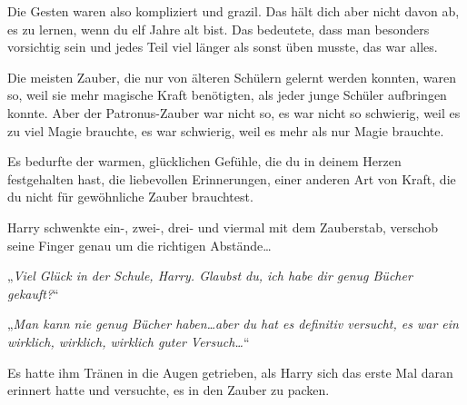Die Gesten waren also kompliziert und grazil. Das hält dich aber nicht davon ab, es zu lernen, wenn du elf Jahre alt bist. Das bedeutete, dass man besonders vorsichtig sein und jedes Teil viel länger als sonst üben musste, das war alles.

Die meisten Zauber, die nur von älteren Schülern gelernt werden konnten, waren so, weil sie mehr magische Kraft benötigten, als jeder junge Schüler aufbringen konnte. Aber der Patronus-Zauber war nicht so, es war nicht so schwierig, weil es zu viel Magie brauchte, es war schwierig, weil es mehr als nur Magie brauchte.

Es bedurfte der warmen, glücklichen Gefühle, die du in deinem Herzen festgehalten hast, die liebevollen Erinnerungen, einer anderen Art von Kraft, die du nicht für gewöhnliche Zauber brauchtest.

Harry schwenkte ein-, zwei-, drei- und viermal mit dem Zauberstab, verschob seine Finger genau um die richtigen Abstände…

„\emph{Viel Glück in der Schule, Harry. Glaubst du, ich habe dir genug Bücher gekauft?}“

„\emph{Man kann nie genug Bücher haben…aber du hat es \emph{definitiv} versucht, es war ein wirklich, wirklich, wirklich guter Versuch…}“

Es hatte ihm Tränen in die Augen getrieben, als Harry sich das erste Mal daran erinnert hatte und versuchte, es in den Zauber zu packen.

